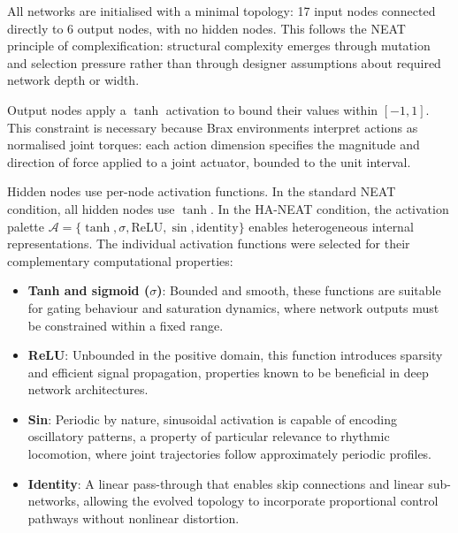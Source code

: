 \documentclass[12pt]{article}
\begin{document}
All networks are initialised with a minimal topology: 17 input nodes connected directly to 6 output nodes, with no hidden nodes.
This follows the NEAT principle of complexification: structural complexity emerges through mutation and selection pressure rather than through designer assumptions about required network depth or width.

Output nodes apply a $\tanh$ activation to bound their values within $[-1, 1]$.
This constraint is necessary because Brax environments interpret actions as normalised joint torques: each action dimension specifies the magnitude and direction of force applied to a joint actuator, bounded to the unit interval.

Hidden nodes use per-node activation functions.
In the standard NEAT condition, all hidden nodes use $\tanh$.
In the HA-NEAT condition, the activation palette $\mathcal{A} = \{\tanh, \sigma, \text{ReLU}, \sin, \text{identity}\}$ enables heterogeneous internal representations.
The individual activation functions were selected for their complementary computational properties:

\begin{itemize}
    \item \textbf{Tanh and sigmoid ($\sigma$)}: Bounded and smooth, these functions are suitable for gating behaviour and saturation dynamics, where network outputs must be constrained within a fixed range.
    \item \textbf{ReLU}: Unbounded in the positive domain, this function introduces sparsity and efficient signal propagation, properties known to be beneficial in deep network architectures.
    \item \textbf{Sin}: Periodic by nature, sinusoidal activation is capable of encoding oscillatory patterns, a property of particular relevance to rhythmic locomotion, where joint trajectories follow approximately periodic profiles.
    \item \textbf{Identity}: A linear pass-through that enables skip connections and linear sub-networks, allowing the evolved topology to incorporate proportional control pathways without nonlinear distortion.
\end{itemize}

\end{document}
